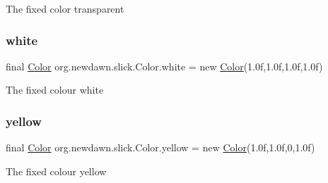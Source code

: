 The fixed color transparent \mbox{\label{classorg_1_1newdawn_1_1slick_1_1_color_afcd91cbdd26233d226d734f70dca3d2e}} 
\subsubsection{\texorpdfstring{white}{white}}
{\footnotesize\ttfamily final \mbox{\hyperlink{classorg_1_1newdawn_1_1slick_1_1_color}{Color}} org.\+newdawn.\+slick.\+Color.\+white = new \mbox{\hyperlink{classorg_1_1newdawn_1_1slick_1_1_color}{Color}}(1.\+0f,1.\+0f,1.\+0f,1.\+0f)\hspace{0.3cm}{\ttfamily [static]}}

The fixed colour white \mbox{\label{classorg_1_1newdawn_1_1slick_1_1_color_af5e19b81adfda22915b71d3a8e7fe6be}} 
\subsubsection{\texorpdfstring{yellow}{yellow}}
{\footnotesize\ttfamily final \mbox{\hyperlink{classorg_1_1newdawn_1_1slick_1_1_color}{Color}} org.\+newdawn.\+slick.\+Color.\+yellow = new \mbox{\hyperlink{classorg_1_1newdawn_1_1slick_1_1_color}{Color}}(1.\+0f,1.\+0f,0,1.\+0f)\hspace{0.3cm}{\ttfamily [static]}}

The fixed colour yellow 